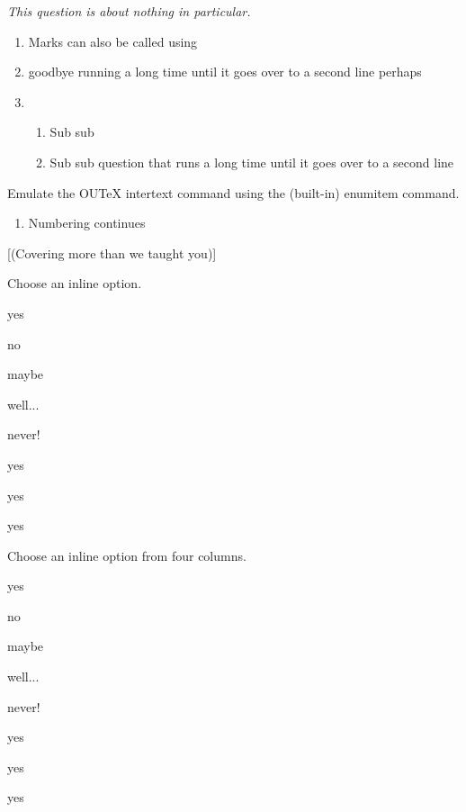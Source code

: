 \documentclass{ouab}
\begin{document}
\emph{This question is about nothing in particular.}
\begin{enumerate}
\item Marks can also be called using 
\item goodbye running a long time until it goes over to a second line perhaps
\item 
\begin{enumerate}
\item Sub sub
\item Sub sub question that runs a long time until it goes over to a second line
\end{enumerate}
\end{enumerate}
Emulate the OUTeX intertext command using the (built-in) enumitem command.
\begin{enumerate}[resume]
\item Numbering continues
\end{enumerate}


[(Covering more than we taught you)]

Choose an inline option.

\begin{inlineoptions}{5} %
\item yes
\item no
\item maybe
\item well...
\item never!
\item yes
\item yes
\item yes
\noitem %
\noitem
\end{inlineoptions}

Choose an inline option from four columns.

\begin{inlineoptions}{4} %
\item yes
\item no
\item maybe
\item well...
\item never!
\item yes
\item yes
\item yes
\end{inlineoptions}
\end{document}
